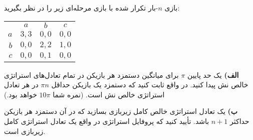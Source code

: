 بازی $n$-بار تکرار شده با بازی مرحله‌ای زیر را در نظر بگیرید:

\LTR 
\begin{latin}
    \begin{center}
        \begin{tabular}{r | c | c | c |}
            \multicolumn{1}{r}{} &
            \multicolumn{1}{c}{$a$} &
            \multicolumn{1}{c}{$b$} &
            \multicolumn{1}{c}{$c$} \\ \cline{2-4}
            $a$       & $3,3$    & $0,0$    & $0,0$  \\ \cline{2-4}
            $b$       & $0,0$    & $2,2$    & $1,0$  \\ \cline{2-4}
            $c$       & $0,0$    & $0,1$    & $0,0$   \\ \cline{2-4}
        \end{tabular}
    \end{center}
\end{latin}
\RTL

\vspace*{5pt}
\textbf{الف)}
یک حد پایین
$\pi$
برای میانگین دستمزد هر بازیکن در تمام تعادل‌های استراتژی خالص نش پیدا کنید. در واقع ثابت کنید که دستمزد یک بازیکن حداقل
$\pi n$
در هر تعادل استراتژی خالص نش است. (نمره شما 
$10 \pi$
خواهد بود.)

\vspace*{5pt}
\textbf{ب)}
یک تعادل استراتژی خالص کامل زیربازی بسازید که در آن دستمزد هر بازیکن حداکثر
$n + 1$
باشد. تأیید کنید که پروفایل استراتژی در واقع یک تعادل استراتژی کامل زیربازی است.